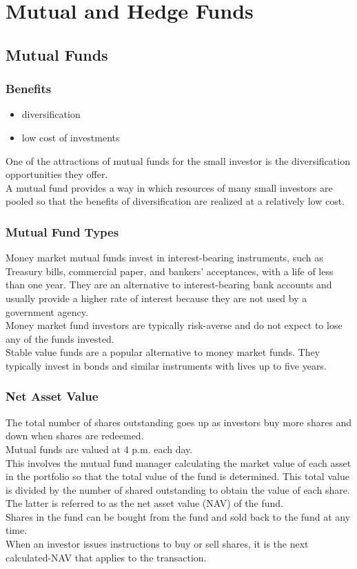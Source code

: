 \chapter{Mutual and Hedge Funds}

\section{Mutual Funds}

\subsection{Benefits}
\begin{itemize}
	\item diversification
	\item low cost of investments
\end{itemize}
One of the attractions of mutual funds for the small investor is the diversification opportunities they offer.\\
A mutual fund provides a way in which resources of many small investors are pooled so that the benefits of diversification are realized at a relatively low cost.

\subsection{Mutual Fund Types}
Money market mutual funds invest in interest-bearing instruments, such as Treasury bills, commercial paper, and bankers' acceptances, with a life of less than one year. They are an alternative to interest-bearing bank accounts and usually provide a higher rate of interest because they are not used by a government agency.\\
Money market fund investors are typically risk-averse and do not expect to lose any of the funds invested.\\
Stable value funds are a popular alternative to money market funds. They typically invest in bonds and similar instruments with lives up to five years.

\subsection{Net Asset Value}
The total number of shares outstanding goes up as investors buy more shares and down when shares are redeemed.\\
Mutual funds are valued at 4 p.m. each day.\\
This involves the mutual fund manager calculating the market value of each asset in the portfolio so that the total value of the fund is determined. This total value is divided by the number of shared outstanding to obtain the value of each share. The latter is referred to as the net asset value (NAV) of the fund.\\
Shares in the fund can be bought from the fund and sold back to the fund at any time.\\
When an investor issues instructions to buy or sell shares, it is the next calculated-NAV that applies to the transaction. 